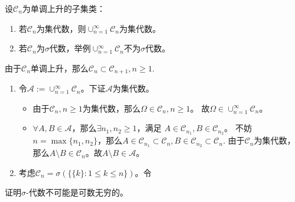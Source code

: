 \documentclass{ctexart}
\begin{document}
\begin{problem} 
  设\(\mathcal{C}_n \)为单调上升的子集类：
  \begin{enumerate}
    \item 若\(\mathcal{C}_n \)为集代数，则\(\cup_{n=1}^{\infty}\mathcal{C}_n \)为集代数。
    \item 若\(\mathcal{C}_n \)为\(\sigma \)代数，举例\(\cup_{n=1}^{\infty}\mathcal{C}_n \)不为\(\sigma \)代数。
  \end{enumerate}
\end{problem}
\begin{solution}
由于\(\mathcal{C}_n \)单调上升，那么\(\mathcal{C}_n \subset \mathcal{C}_{n + 1}, n \geq 1 \).
\begin{enumerate}
  \item 令\(\mathcal{A}:=\cup_{n=1}^{\infty} \mathcal{C}_n \)。下证\(\mathcal{A} \)为集代数。
    \begin{itemize}
      \item 由于\(\mathcal{C}_n,n \geq 1\)为集代数，那么\(\Omega \in \mathcal{C}_n ,n \geq 1 \)。 故\(\Omega \in \cup_{n=1}^{\infty} \mathcal{C}_n \)。
      \item \(\forall A,B \in \mathcal{A} \)，那么\(\exists n_1,n_2 \geq 1 \)，满足 \(A \in \mathcal{C}_{n_1},B \in \mathcal{C}_{n_2} \)。
        不妨\(n = \max\{n_1,n_2\} \)，那么\(A \in \mathcal{C}_{n_1} \subset \mathcal{C}_n, B \in \mathcal{C}_{n_2} \subset \mathcal{C}_n\).
        由于\(\mathcal{C}_n \)为集代数，那么\(A \setminus B \in \mathcal{C}_n \)。故\(A \setminus B \in \mathcal{A} \)。
    \end{itemize}
  \item 考虑\(\mathcal{C}_n=\sigma(\{\{k\}: 1 \leq k \leq n\}) \)。令\( \)
\end{enumerate}
\end{solution}


\begin{problem} 
  证明\(\sigma \)-代数不可能是可数无穷的。
\end{problem}
\end{document}
